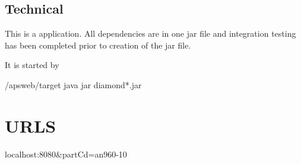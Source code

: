 \documentclass[letterpaper,10pt,english]{sphinxmanual}
\begin{document}
\section{Technical}
\label{\detokenize{index:technical}}
This is a  application.  All dependencies are in one jar file and integration testing has been completed
prior to creation of the jar file.

It is started by

\begin{sphinxVerbatim}[commandchars=\\\{\}]
 /aps\PYGZhy{}web/target
java \PYGZhy{}jar diamond*.jar
\end{sphinxVerbatim}


\chapter{URLS}
\label{\detokenize{index:urls}}
localhost:8080\&partCd=an960-10



\renewcommand{\indexname}{Index}
\printindex
\end{document}
